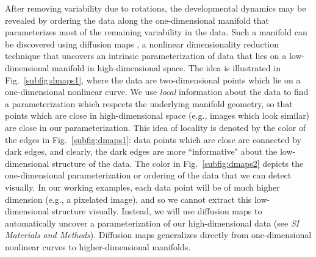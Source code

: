 \documentclass{pnastwo}
\makeatletter
\newcommand{\SI}[0]{{\it SI Materials and Methods}}
\newcommand{\fig}[0]{Fig.}
\newcommand{\customlabel}[2]{%
\protected@write \@auxout {}{\string \newlabel {#1}{{#2}{}}}}
\makeatother
\begin{document}
\begin{article}
After removing variability due to rotations, the developmental dynamics may be revealed by ordering the data along the one-dimensional manifold that parameterizes most of the remaining variability in the data.
%
Such a manifold can be discovered using diffusion maps \cite{coifman2005geometric}, a nonlinear dimensionality reduction technique that uncovers an intrinsic parameterization of data that lies on a low-dimensional manifold in high-dimensional space.
%
The idea is illustrated in \fig~\ref{subfig:dmaps1}, where the data are two-dimensional points which lie on a one-dimensional nonlinear curve.
%
We use {\it local} information about the data to find a parameterization which respects the underlying manifold geometry, so that points which are close in high-dimensional space (e.g., images which look similar) are close in our parameterization.
%
This idea of locality is denoted by the color of the edges in \fig~\ref{subfig:dmaps1}:
data points which are close are connected by dark edges, and clearly, the dark edges are more ``informative" about the low-dimensional structure of the data.
%
The color in \fig~\ref{subfig:dmaps2} depicts the one-dimensional parameterization or ordering of the data that we can detect visually.
%
In our working examples, each data point will be of much higher dimension (e.g., a pixelated image), and so we cannot extract this low-dimensional structure visually.
%
Instead, we will use diffusion maps to automatically uncover a parameterization of our high-dimensional data (see \SI).
%
Diffusion maps generalizes directly from one-dimensional nonlinear curves to higher-dimensional manifolds.





\end{article}
\end{document}

